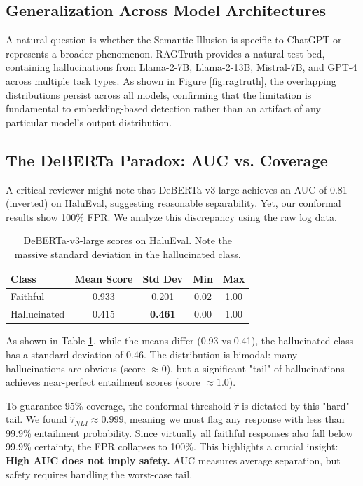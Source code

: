 \documentclass[11pt]{article}
\begin{document}
\subsection{Generalization Across Model Architectures}

A natural question is whether the Semantic Illusion is specific to ChatGPT or represents a broader phenomenon. RAGTruth provides a natural test bed, containing hallucinations from Llama-2-7B, Llama-2-13B, Mistral-7B, and GPT-4 across multiple task types. As shown in Figure \ref{fig:ragtruth}, the overlapping distributions persist across all models, confirming that the limitation is fundamental to embedding-based detection rather than an artifact of any particular model's output distribution.

\subsection{The DeBERTa Paradox: AUC vs. Coverage}
\label{sec:deberta}

A critical reviewer might note that DeBERTa-v3-large achieves an AUC of 0.81 (inverted) on HaluEval, suggesting reasonable separability. Yet, our conformal results show 100\% FPR. We analyze this discrepancy using the raw log data.

\begin{table}[htbp]
\centering
\caption{DeBERTa-v3-large scores on HaluEval. Note the massive standard deviation in the hallucinated class.}
\label{tab:deberta_stats}
\begin{tabular}{lcccc}
\toprule
\textbf{Class} & \textbf{Mean Score} & \textbf{Std Dev} & \textbf{Min} & \textbf{Max} \\
\midrule
Faithful & 0.933 & 0.201 & 0.02 & 1.00 \\
Hallucinated & 0.415 & \textbf{0.461} & 0.00 & 1.00 \\
\bottomrule
\end{tabular}
\end{table}

As shown in Table \ref{tab:deberta_stats}, while the means differ (0.93 vs 0.41), the hallucinated class has a standard deviation of 0.46. The distribution is bimodal: many hallucinations are obvious (score $\approx 0$), but a significant "tail" of hallucinations achieves near-perfect entailment scores (score $\approx 1.0$).

To guarantee 95\% coverage, the conformal threshold $\hat{\tau}$ is dictated by this "hard" tail. We found $\hat{\tau}_{NLI} \approx 0.999$, meaning we must flag any response with less than 99.9\% entailment probability. Since virtually all faithful responses also fall below 99.9\% certainty, the FPR collapses to 100\%. This highlights a crucial insight: \textbf{High AUC does not imply safety.} AUC measures average separation, but safety requires handling the worst-case tail.
\end{document}
